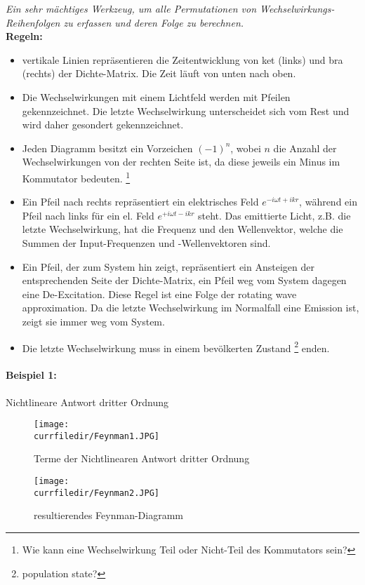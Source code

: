 \textit{Ein sehr mächtiges Werkzeug, um  alle Permutationen von
Wechselwirkungs-Reihenfolgen zu erfassen und deren Folge zu
berechnen.}\\
\textbf{Regeln:}
\begin{itemize}
    \item vertikale Linien repräsentieren die Zeitentwicklung von ket (links) und bra (rechts) der Dichte-Matrix. Die Zeit läuft von unten nach oben.
    \item Die Wechselwirkungen mit einem Lichtfeld werden mit Pfeilen gekennzeichnet. Die letzte Wechselwirkung unterscheidet sich vom Rest und wird daher gesondert gekennzeichnet.
    \item Jeden Diagramm besitzt ein Vorzeichen $(-1)^n$, wobei $n$ die Anzahl der Wechselwirkungen von der rechten Seite ist, da diese jeweils ein Minus im Kommutator bedeuten. \footnote{Wie kann eine Wechselwirkung Teil oder Nicht-Teil des Kommutators sein?}
    \item Ein Pfeil nach rechts repräsentiert ein elektrisches Feld $e^{-i \omega t + ikr}$, während ein Pfeil nach links für ein el. Feld $e^{+i \omega t - ikr}$ steht. Das emittierte Licht, z.B. die letzte Wechselwirkung, hat die Frequenz und den Wellenvektor, welche die Summen der Input-Frequenzen und -Wellenvektoren sind.
    \item Ein Pfeil, der zum System hin zeigt, repräsentiert ein Ansteigen der entsprechenden Seite der Dichte-Matrix, ein Pfeil weg vom System dagegen eine De-Excitation. Diese Regel ist eine Folge der rotating wave approximation. Da die letzte Wechselwirkung im Normalfall eine Emission ist, zeigt sie immer weg vom System.
    \item Die letzte Wechselwirkung muss in einem bevölkerten Zustand \footnote{population state?} enden.
\end{itemize}
\paragraph{Beispiel 1:} Nichtlineare Antwort dritter Ordnung
\begin{figure} [h]
    \centering
    \texttt{[image: \\currfiledir/Feynman1.JPG]}
    \caption{Terme der Nichtlinearen Antwort dritter Ordnung}
    \label{fig:Feynman1}
\end{figure}
\begin{figure} [h]
    \centering
    \texttt{[image: \\currfiledir/Feynman2.JPG]}
    \caption{resultierendes Feynman-Diagramm}
    \label{fig:Feynman2}
\end{figure}

